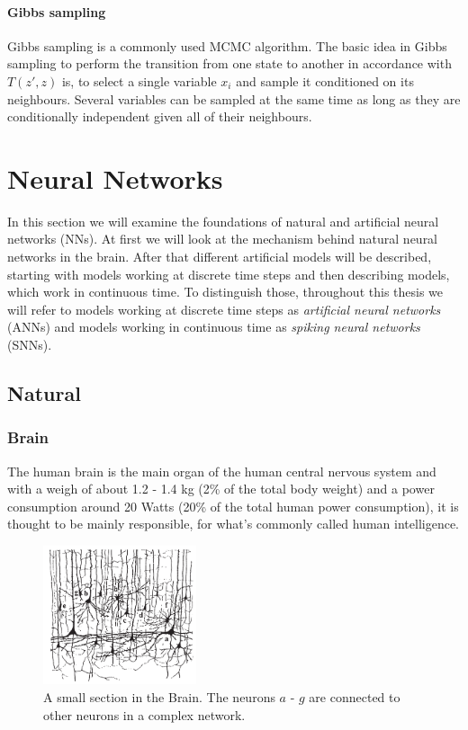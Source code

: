 \paragraph{Gibbs sampling} Gibbs sampling is a commonly used MCMC algorithm. The basic idea in Gibbs sampling to perform the transition from one state to another in accordance with $T(z',z)$ is, to select a single variable $x_i$ and sample it conditioned on its neighbours. 
Several variables can be sampled at the same time as long as they are conditionally independent given all of their neighbours.

\section{Neural Networks}

In this section we will examine the foundations of natural and artificial neural networks (NNs).
At first we will look at the mechanism behind natural neural networks in the brain.
After that different artificial models will be described, starting with models working at discrete time steps and then describing models, which work in continuous time.
To distinguish those, throughout this thesis we will refer to models working at discrete time steps as \textit{artificial neural networks} (ANNs) and models working in continuous time as \textit{spiking neural networks} (SNNs).

\subsection{Natural}
\subsubsection{Brain}

The human brain is the main organ of the human central nervous system and with a weigh of about 1.2 - 1.4 kg (2\% of the total body weight) and a power consumption around 20 Watts (20\% of the total human power consumption), it is thought to be mainly responsible, for what's commonly called human intelligence.  

\begin{figure}
	\centering
    	\includegraphics[width=0.4\textwidth]{imgs/brain.png} 
    \caption{A small section in the Brain. The neurons $a$ - $g$ are connected to other neurons in a complex network.}
	\label{fig:brain}
\end{figure}

